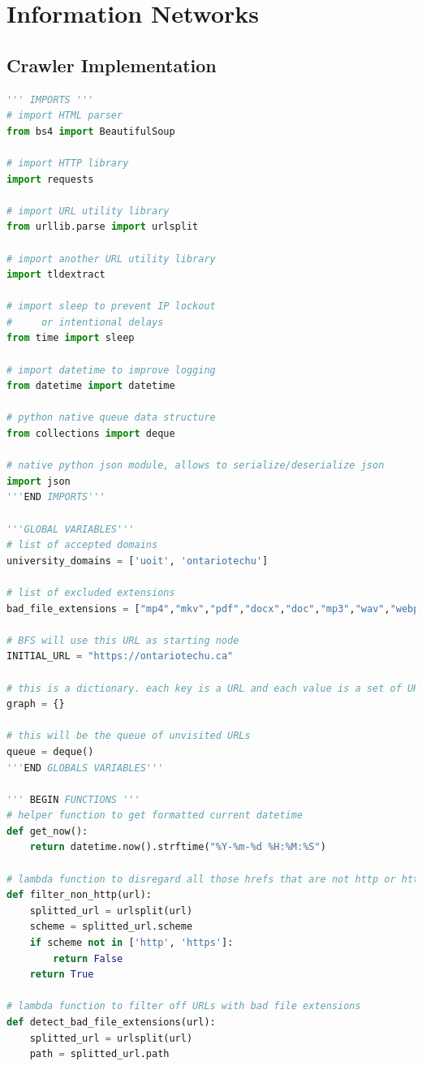 \section{Information Networks}

\subsection{Crawler Implementation}
\begin{lstlisting}[language=Python]
''' IMPORTS '''
# import HTML parser
from bs4 import BeautifulSoup

# import HTTP library
import requests

# import URL utility library
from urllib.parse import urlsplit

# import another URL utility library
import tldextract

# import sleep to prevent IP lockout
#     or intentional delays
from time import sleep

# import datetime to improve logging
from datetime import datetime

# python native queue data structure
from collections import deque

# native python json module, allows to serialize/deserialize json
import json
'''END IMPORTS'''

'''GLOBAL VARIABLES'''
# list of accepted domains
university_domains = ['uoit', 'ontariotechu']

# list of excluded extensions
bad_file_extensions = ["mp4","mkv","pdf","docx","doc","mp3","wav","webp", "jpg", "png"]

# BFS will use this URL as starting node
INITIAL_URL = "https://ontariotechu.ca"

# this is a dictionary. each key is a URL and each value is a set of URLs that are referenced by the key
graph = {}

# this will be the queue of unvisited URLs
queue = deque()
'''END GLOBALS VARIABLES'''

''' BEGIN FUNCTIONS '''
# helper function to get formatted current datetime
def get_now():
    return datetime.now().strftime("%Y-%m-%d %H:%M:%S")

# lambda function to disregard all those hrefs that are not http or https pages, e.g. mailto
def filter_non_http(url):
    splitted_url = urlsplit(url)
    scheme = splitted_url.scheme
    if scheme not in ['http', 'https']:
        return False
    return True

# lambda function to filter off URLs with bad file extensions
def detect_bad_file_extensions(url):
    splitted_url = urlsplit(url)
    path = splitted_url.path


\end{lstlisting}
